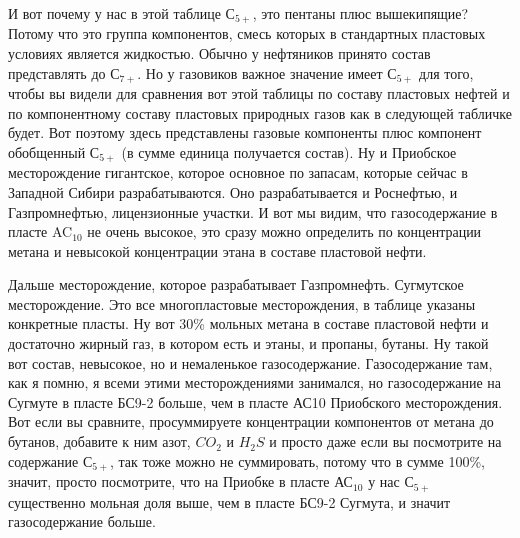\documentclass[main.tex]{subfiles}
\begin{document}
И вот почему у нас в этой таблице $С_{5+}$, это пентаны плюс вышекипящие?
Потому что это группа компонентов, смесь которых в стандартных пластовых условиях является жидкостью.
Обычно у нефтяников принято состав представлять до $С_{7+}$.
Но у газовиков важное значение имеет $С_{5+}$ для того, чтобы вы видели для сравнения вот этой таблицы по составу пластовых нефтей и по компонентному составу пластовых природных газов как в следующей табличке будет.
Вот поэтому здесь представлены газовые компоненты плюс компонент обобщенный $С_{5+}$ (в сумме единица получается состав).
Ну и Приобское месторождение гигантское, которое основное по запасам, которые сейчас в Западной Сибири разрабатываются.
Оно разрабатывается и Роснефтью, и Газпромнефтью, лицензионные участки.
И вот мы видим, что газосодержание в пласте AC$_{10}$ не очень высокое, это сразу можно определить по концентрации метана и невысокой концентрации этана в составе пластовой нефти.

Дальше месторождение, которое разрабатывает Газпромнефть.
Сугмутское месторождение.
Это все многопластовые месторождения, в таблице указаны конкретные пласты.
Ну вот 30\% мольных метана в составе пластовой нефти и достаточно жирный газ, в котором есть и этаны, и пропаны, бутаны.
Ну такой вот состав, невысокое, но и немаленькое газосодержание.
Газосодержание там, как я помню, я всеми этими месторождениями занимался, но газосодержание на Сугмуте в пласте БС9-2 больше, чем в пласте АС10 Приобского месторождения.
Вот если вы сравните, просуммируете концентрации компонентов от метана до бутанов, добавите к ним азот, $CO_2$ и $H_2S$ и просто даже если вы посмотрите на содержание $С_{5+}$, так тоже можно не суммировать, потому что в сумме 100\%, значит, просто посмотрите, что на Приобке в пласте АС$_{10}$ у нас $С_{5+}$ существенно мольная доля выше, чем в пласте БС9-2 Сугмута, и значит газосодержание больше.
\end{document}

